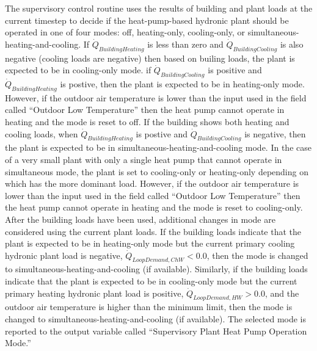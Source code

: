 The supervisory control routine uses the results of building and plant loads at the current timestep to decide if the heat-pump-based hydronic plant should be operated in one of four modes: off, heating-only, cooling-only, or simultaneous-heating-and-cooling. If $\dot Q_{BuildingHeating}$ is less than zero and $\dot Q_{BuildingCooling}$ is also negative (cooling loads are negative) then based on builing loads, the plant is expected to be in cooling-only mode.  if $\dot Q_{BuildingCooling}$ is positive and $\dot Q_{BuildingHeating}$ is postive, then the plant is expected to be in heating-only mode. However, if the outdoor air temperature is lower than the input used in the field called ``Outdoor Low Temperature'' then the heat pump cannot operate in heating and the mode is reset to off. If the building shows both heating and cooling loads, when $\dot Q_{BuildingHeating}$ is postive and $\dot Q_{BuildingCooling}$ is negative, then the plant is expected to be in simultaneous-heating-and-cooling mode.  In the case of a very small plant with only a single heat pump that cannot operate in simultaneous mode, the plant is set to cooling-only or heating-only depending on which has the more dominant load. However, if the outdoor air temperature is lower than the input used in the field called ``Outdoor Low Temperature'' then the heat pump cannot operate in heating and the mode is reset to cooling-only. After the building loads have been used, additional changes in mode are considered using the current plant loads. If the building loads indicate that the plant is expected to be in heating-only mode but the current primary cooling hydronic plant load is negative, $\dot Q_{LoopDemand, ChW} < 0.0$, then the mode is changed to simultaneous-heating-and-cooling (if available). Similarly, if the building loads indicate that the plant is expected to be in cooling-only mode but the current primary heating hydronic plant load is positive, $\dot Q_{LoopDemand, HW} > 0.0$, and the outdoor air temperature is higher than the minimum limit, then the mode is changed to simultaneous-heating-and-cooling (if available).  The selected mode is reported to the output variable called ``Supervisory Plant Heat Pump Operation Mode.''

